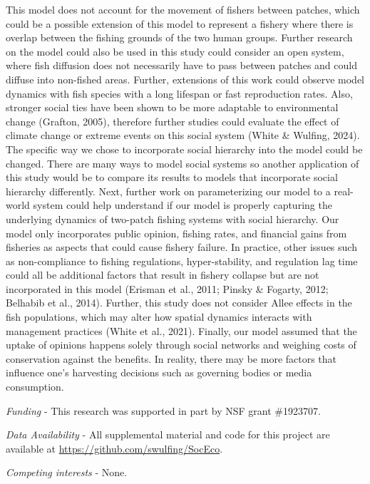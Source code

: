 \documentclass[
  12pt,
]{article}
\begin{document}
This model does not account for the movement of fishers between patches, which could be a possible extension of this model to represent a fishery where there is overlap between the fishing grounds of the two human groups. Further research on the model could also be used in this study could consider an open system, where fish diffusion does not necessarily have to pass between patches and could diffuse into non-fished areas. Further, extensions of this work could observe model dynamics with fish species with a long lifespan or fast reproduction rates. Also, stronger social ties have been shown to be more adaptable to environmental change (Grafton, 2005), therefore further studies could evaluate the effect of climate change or extreme events on this social system (White \& Wulfing, 2024). The specific way we chose to incorporate social hierarchy into the model could be changed. There are many ways to model social systems so another application of this study would be to compare its results to models that incorporate social hierarchy differently. Next, further work on parameterizing our model to a real-world system could help understand if our model is properly capturing the underlying dynamics of two-patch fishing systems with social hierarchy. Our model only incorporates public opinion, fishing rates, and financial gains from fisheries as aspects that could cause fishery failure. In practice, other issues such as non-compliance to fishing regulations, hyper-stability, and regulation lag time could all be additional factors that result in fishery collapse but are not incorporated in this model (Erisman et al., 2011; Pinsky \& Fogarty, 2012; Belhabib et al., 2014). Further, this study does not consider Allee effects in the fish populations, which may alter how spatial dynamics interacts with management practices (White et al., 2021). Finally, our model assumed that the uptake of opinions happens solely through social networks and weighing costs of conservation against the benefits. In reality, there may be more factors that influence one's harvesting decisions such as governing bodies or media consumption.

\emph{Funding} - This research was supported in part by NSF grant \#1923707.

\emph{Data Availability} - All supplemental material and code for this project are available at \url{https://github.com/swulfing/SocEco}.

\emph{Competing interests} - None.

\newpage
\end{document}
